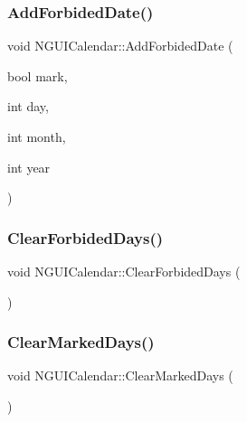 \hypertarget{class_n_g_u_i_calendar_a642fd7d1b476856e425d555eb6c3fa12}{}\label{class_n_g_u_i_calendar_a642fd7d1b476856e425d555eb6c3fa12} 
\subsubsection{\texorpdfstring{Add\+Forbided\+Date()}{AddForbidedDate()}}
{\footnotesize\ttfamily void N\+G\+U\+I\+Calendar\+::\+Add\+Forbided\+Date (\begin{DoxyParamCaption}\item[{bool}]{mark,  }\item[{int}]{day,  }\item[{int}]{month,  }\item[{int}]{year }\end{DoxyParamCaption})}

\hypertarget{class_n_g_u_i_calendar_a5e15f28be7923927b8303819fa0c5131}{}\label{class_n_g_u_i_calendar_a5e15f28be7923927b8303819fa0c5131} 
\subsubsection{\texorpdfstring{Clear\+Forbided\+Days()}{ClearForbidedDays()}}
{\footnotesize\ttfamily void N\+G\+U\+I\+Calendar\+::\+Clear\+Forbided\+Days (\begin{DoxyParamCaption}{ }\end{DoxyParamCaption})}

\hypertarget{class_n_g_u_i_calendar_a899d680f524432746ba24549d54ce858}{}\label{class_n_g_u_i_calendar_a899d680f524432746ba24549d54ce858} 
\subsubsection{\texorpdfstring{Clear\+Marked\+Days()}{ClearMarkedDays()}}
{\footnotesize\ttfamily void N\+G\+U\+I\+Calendar\+::\+Clear\+Marked\+Days (\begin{DoxyParamCaption}{ }\end{DoxyParamCaption})}

